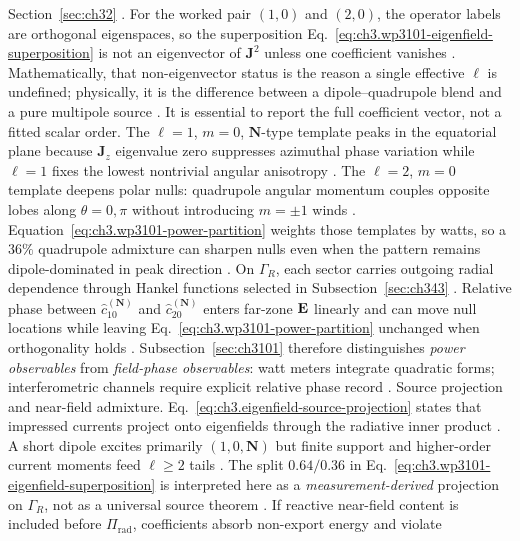 Section~\ref{sec:ch32} \cite{jackson1999}. For the worked pair \((1,0)\) and \((2,0)\), the operator labels
are orthogonal eigenspaces, so the superposition Eq.~\eqref{eq:ch3.wp3101-eigenfield-superposition} is not an eigenvector of
\(\mathbf{J}^{2}\) unless one coefficient vanishes \cite{harrington2001}. Mathematically, that non-eigenvector status is
the reason a single effective \(\ell\) is undefined; physically, it is the difference between a dipole--quadrupole blend and a pure
multipole source \cite{jackson1999}. It is essential to report the full coefficient vector, not a fitted scalar order.
The \(\ell=1\), \(m=0\), \(\mathbf{N}\)-type template peaks in the equatorial plane because \(\mathbf{J}_{z}\) eigenvalue zero suppresses
azimuthal phase variation while \(\ell=1\) fixes the lowest nontrivial angular anisotropy \cite{jackson1999}. The \(\ell=2\),
\(m=0\) template deepens polar nulls: quadrupole angular momentum couples opposite lobes along \(\theta=0,\pi\) without introducing
\(m=\pm1\) winds \cite{stratton1941}. Equation~\eqref{eq:ch3.wp3101-power-partition} weights those templates by watts, so a
\(36\%\) quadrupole admixture can sharpen nulls even when the pattern remains dipole-dominated in peak direction \cite{poynting1884}.
On \(\Gamma_R\), each sector carries outgoing radial dependence through Hankel functions selected in Subsection~\ref{sec:ch343}
\cite{hansen1988}. Relative phase between \(\widehat{c}_{10}^{(\mathbf{N})}\) and \(\widehat{c}_{20}^{(\mathbf{N})}\) enters
far-zone \(\mathbf{E}\) linearly and can move null locations while leaving Eq.~\eqref{eq:ch3.wp3101-power-partition} unchanged when orthogonality holds
\cite{jackson1999}. Subsection~\ref{sec:ch3101} therefore distinguishes \emph{power observables} from \emph{field-phase
observables}: watt meters integrate quadratic forms; interferometric channels require explicit relative phase record
\cite{stratton1941}.
Source projection and near-field admixture. Eq.~\eqref{eq:ch3.eigenfield-source-projection} states that impressed currents project onto eigenfields through the radiative inner product
\cite{stratton1941}. A short dipole excites primarily \((1,0,\mathbf{N})\) but finite support and higher-order current moments
feed \(\ell\ge2\) tails \cite{jackson1999}. The split \(0.64/0.36\) in Eq.~\eqref{eq:ch3.wp3101-eigenfield-superposition} is
interpreted here as a \emph{measurement-derived} projection on \(\Gamma_R\), not as a universal source theorem \cite{harrington2001}.
If reactive near-field content is included before \(\Pi_{\mathrm{rad}}\), coefficients absorb non-export energy and violate
